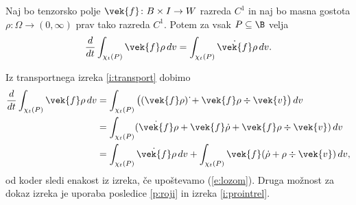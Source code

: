 \begin{izrek}
	Naj bo tenzorsko polje $\vek{f}\colon B\times I\to W$ razreda $C^1$ in naj bo masna gostota
	$\rho\colon\Omega\to(0,\infty)$ prav tako razreda $C^1$.
	Potem za vsak $P\subseteq\B$ velja
	\[
		\frac{d}{dt}\int_{\chi_t(P)}\vek{f}\rho\,dv=
		\int_{\chi_t(P)}\dot{\vek{f}}\rho\,dv.
	\]
\end{izrek}
\proof
	Iz transportnega izreka \ref{i:transport} dobimo
	\begin{align*}
		\frac{d}{dt}\int_{\chi_t(P)}\vek{f}\rho\,dv
		&= \int_{\chi_t(P)}\big((\vek{f}\rho)\,\dot{}+\vek{f}\rho\div\vek{v}\big)\,dv \\
		&= \int_{\chi_t(P)}(\dot{\vek{f}}\rho+\vek{f}\dot{\rho}+\vek{f}\rho\div\vek{v})\,dv\\
		&= \int_{\chi_t(P)}\dot{\vek{f}}\rho\,dv+
		\int_{\chi_t(P)}\vek{f}(\dot{\rho}+\rho\div\vek{v})\,dv,
	\end{align*}
	od koder sledi enakost iz izreka, če upoštevamo (\ref{e:lozom}).
\endproof
Druga možnost za dokaz izreka je uporaba posledice \ref{p:roji} in
izreka \ref{i:prointrel}.